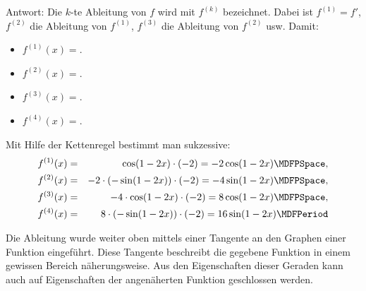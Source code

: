 \begin{MExercises}
\begin{MExercise}
Antwort: 
Die $k$-te Ableitung von $f$ wird mit $f^{(k)}$ bezeichnet. Dabei ist $f^{(1)} = f'$, $f^{(2)}$ die Ableitung von $f^{(1)}$,
$f^{(3)}$ die Ableitung von $f^{(2)}$ usw.
Damit:
\begin{itemize}
\item
 $f^{(1)}(x) = $.
\item
 $f^{(2)}(x) = $.
\item
 $f^{(3)}(x) = $.
\item
 $f^{(4)}(x) = $.
\end{itemize}
\begin{MHint}{\iSolution}
 Mit Hilfe der Kettenregel bestimmt man sukzessive:
 \begin{eqnarray*}
  f^{(1)} (x) & = & \cos(1 - 2x) \cdot (-2) = -2 \cos(1 - 2x) \MDFPSpace , \\
  f^{(2)} (x) & = & -2 \cdot \left( - \sin (1 - 2x) \right) \cdot (-2) = -4 \sin (1 - 2x) \MDFPSpace , \\
  f^{(3)} (x) & = & -4 \cdot \cos (1 - 2x) \cdot (-2) = 8 \cos (1 - 2x) \MDFPSpace , \\
  f^{(4)} (x) & = & 8 \cdot \left( - \sin (1 - 2x) \right) \cdot (-2) = 16 \sin (1 - 2x) \MDFPeriod
 \end{eqnarray*}
\end{MHint}
\end{MExercise}

\end{MExercises}




\begin{MIntro}
Die Ableitung wurde weiter oben mittels einer Tangente an den Graphen einer Funktion eingeführt. Diese Tangente beschreibt die gegebene Funktion
in einem gewissen Bereich {\glqq}näherungsweise{\grqq}. Aus den Eigenschaften dieser Geraden kann auch auf Eigenschaften der
angenäherten Funktion geschlossen werden.
\end{MIntro}

